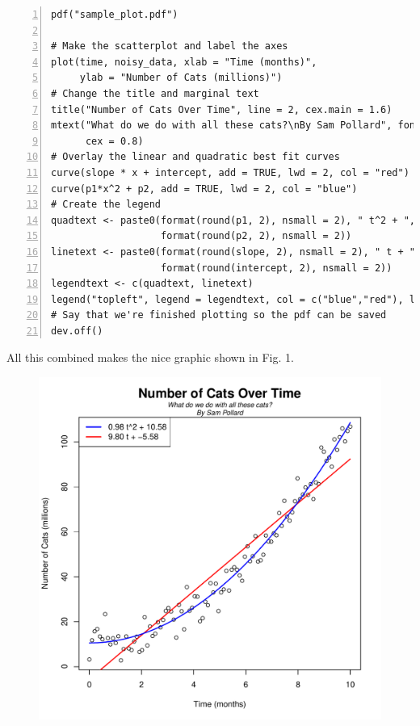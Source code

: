 \documentclass[12pt]{article}
\begin{document}
\begin{Verbatim}[frame=single, fontsize=\small, numbers=left]
pdf("sample_plot.pdf") 

# Make the scatterplot and label the axes
plot(time, noisy_data, xlab = "Time (months)",
     ylab = "Number of Cats (millions)")
# Change the title and marginal text
title("Number of Cats Over Time", line = 2, cex.main = 1.6)
mtext("What do we do with all these cats?\nBy Sam Pollard", font = 3,
      cex = 0.8)
# Overlay the linear and quadratic best fit curves
curve(slope * x + intercept, add = TRUE, lwd = 2, col = "red")
curve(p1*x^2 + p2, add = TRUE, lwd = 2, col = "blue")
# Create the legend
quadtext <- paste0(format(round(p1, 2), nsmall = 2), " t^2 + ",
                   format(round(p2, 2), nsmall = 2))
linetext <- paste0(format(round(slope, 2), nsmall = 2), " t + ",
                   format(round(intercept, 2), nsmall = 2))
legendtext <- c(quadtext, linetext)
legend("topleft", legend = legendtext, col = c("blue","red"), lwd = c(2,2))
# Say that we're finished plotting so the pdf can be saved
dev.off()
\end{Verbatim}

All this combined makes the nice graphic shown in Fig. 1.

\begin{figure}[h]
\centering
\includegraphics[scale=0.7]{sample_plot}
\end{figure}
\end{document}
